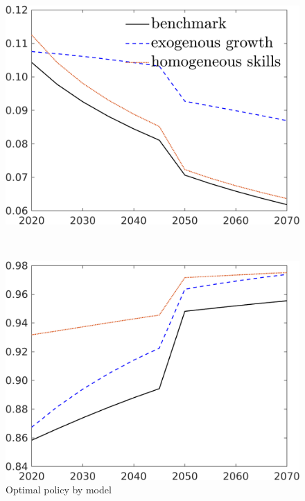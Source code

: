 \begin{figure}[h!!]
	\centering
	\caption{Optimal policy by model}\label{fig:comp_mod}
	
	\begin{minipage}[]{0.4\textwidth}
		\includegraphics[width=1\textwidth]{../../codding_model/own_basedOnFried/optimalPol_190722_tidiedUp/figures/all_10Aout22/CompMod1_OPT_T_NoTaus_taul_regime3_spillover0_noskill0_sep1_xgrowth0_extern0_PV1_etaa0.79_lgd1.png}
	\end{minipage}
	\begin{minipage}[]{0.1\textwidth}
		\
	\end{minipage}
	\begin{minipage}[]{0.4\textwidth}
		\includegraphics[width=1\textwidth]{../../codding_model/own_basedOnFried/optimalPol_190722_tidiedUp/figures/all_10Aout22/CompMod1_OPT_T_NoTaus_tauf_regime3_spillover0_noskill0_sep1_xgrowth0_extern0_PV1_etaa0.79_lgd0.png}
	\end{minipage}
\end{figure}

